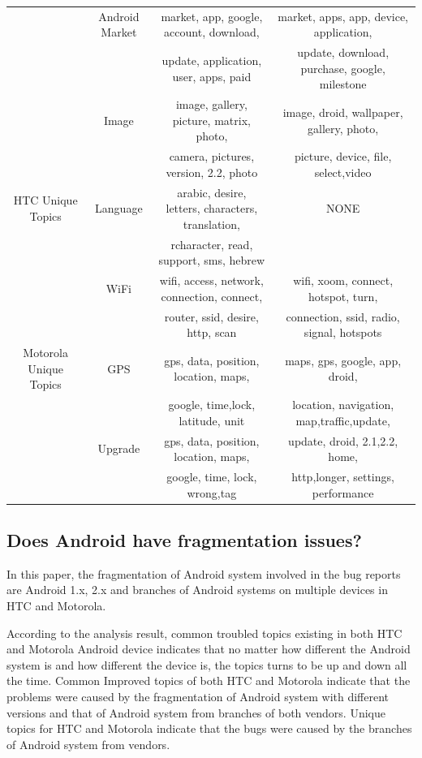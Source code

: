 \documentclass[10pt, conference, compsocconf]{IEEEtran}
\begin{document}
\begin{table}[!htb]
\begin{tabular}{|c||c||c||c|}
               &Android Market& market, app, google, account, download, &market, apps, app, device, application,  \\
           &&update, application, user, apps,	paid &update, download, purchase, google,  milestone \\ \cline{2-4}
           
    &Image & image, gallery, picture, matrix, photo,  &image, droid, wallpaper, gallery, photo,\\
           &&camera, pictures, version, 2.2, photo& picture, device,	file, select,video\\

\hline
HTC Unique Topics & Language &arabic, desire, letters, characters, translation, & NONE\\
           &&rcharacter, read, support, sms, hebrew & \\ \cline{2-4}
    &WiFi & wifi, access, network, connection, connect, &wifi, xoom, connect, hotspot, turn, \\
           &&router, ssid, desire, http, scan&connection, ssid, radio, signal, hotspots\\
\hline
Motorola Unique Topics & GPS &gps, data, position, location, maps, &maps, gps, google, app, droid, \\
           &&google, time,lock, latitude, unit &location, navigation, map,traffic,update,\\ \cline{2-4}

    &Upgrade & gps, data, position, location, maps, &update, droid, 2.1,2.2, home, \\
           &&google, time, lock, wrong,tag&http,longer, settings, performance\\
\hline
\end{tabular}
\end{table}




\subsection{Does Android have fragmentation issues?}

In this paper, the fragmentation of Android system involved in the bug reports are Android 1.x, 2.x and branches of Android systems on multiple devices in HTC and Motorola. 

According to the analysis result, common troubled topics existing in both HTC and Motorola Android device indicates that no matter how different the Android system is and how different the device is, the topics turns to be up and down all the time. Common Improved topics of both HTC and Motorola indicate that the problems were caused by the fragmentation of Android system with different versions and that of Android system from branches of both vendors. Unique topics for HTC and Motorola indicate that the bugs were caused by the branches of Android system from vendors.
\end{document}
